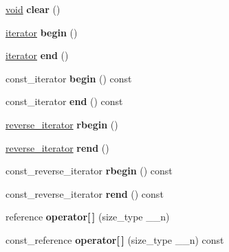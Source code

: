 \begin{DoxyCompactItemize}
\item 
\mbox{\label{classdeque_acc5ec5ff14dce593a54256378d6bb15e}} 
\hyperlink{interfacevoid}{void} {\bfseries clear} ()
\item 
\mbox{\label{classdeque_a3f138e445edc68e29f8f8d338406ba89}} 
\hyperlink{structiterator}{iterator} {\bfseries begin} ()
\item 
\mbox{\label{classdeque_a1391e9f01e6d240ae3a083e760ce284b}} 
\hyperlink{structiterator}{iterator} {\bfseries end} ()
\item 
\mbox{\label{classdeque_abee8f8d17f37958b4f56d2f4c2f71edf}} 
const\+\_\+iterator {\bfseries begin} () const
\item 
\mbox{\label{classdeque_a004885c837a83910ec104ceda37f0408}} 
const\+\_\+iterator {\bfseries end} () const
\item 
\mbox{\label{classdeque_a21b60cb0c9936e92371d5ad74a59619b}} 
\hyperlink{classreverse__iterator}{reverse\+\_\+iterator} {\bfseries rbegin} ()
\item 
\mbox{\label{classdeque_a6000323ead2caf0fb56c2ea65928702f}} 
\hyperlink{classreverse__iterator}{reverse\+\_\+iterator} {\bfseries rend} ()
\item 
\mbox{\label{classdeque_a660e4820eb547ee737f5cfa9ca0f5372}} 
const\+\_\+reverse\+\_\+iterator {\bfseries rbegin} () const
\item 
\mbox{\label{classdeque_a413dcab1e427b0a5f81f14c6d3bdab1f}} 
const\+\_\+reverse\+\_\+iterator {\bfseries rend} () const
\item 
\mbox{\label{classdeque_a7c16a67c6054482aa1696308d7661937}} 
reference {\bfseries operator\mbox{[}$\,$\mbox{]}} (size\+\_\+type \+\_\+\+\_\+n)
\item 
\mbox{\label{classdeque_a7de0dc94b74d36c1f1666491f18abc77}} 
const\+\_\+reference {\bfseries operator\mbox{[}$\,$\mbox{]}} (size\+\_\+type \+\_\+\+\_\+n) const
\item 
\mbox{\label{classdeque_ae77cf0a0716fd6930ec8799a00ec1e6b}} 

\end{DoxyCompactItemize}
